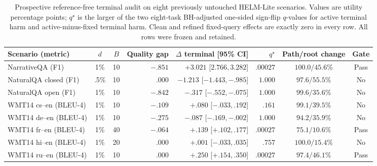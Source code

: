 \begin{table}[H]
\centering
\caption{Prospective reference-free terminal audit on eight previously untouched HELM-Lite scenarios. Values are utility percentage points; $q^\star$ is the larger of the two eight-task BH-adjusted one-sided sign-flip $q$-values for active terminal harm and active-minus-fixed terminal harm. Clean and refined fixed-query effects are exactly zero in every row. All rows were frozen and retained.}
\label{tab:step87b-reference-free}
\scriptsize
\setlength{\tabcolsep}{3.2pt}
\begin{tabular}{@{}lccrrrcc@{}}
\toprule
Scenario (metric) & $d$ & $B$ & Quality gap & $\Delta$ terminal [95\% CI] & $q^\star$ & Path/root change & Gate \\
\midrule
NarrativeQA (F1) & 1\% & 10 & $-.851$ & $+3.021$ [$2.766,3.282$] & $.00027$ & $100.0/45.6$\% & Pass \\
NaturalQA closed (F1) & .5\% & 10 & $.000$ & $-1.213$ [$-1.443,-.985$] & $1.000$ & $97.6/55.5$\% & No \\
NaturalQA open (F1) & 1\% & 10 & $-.842$ & $-.317$ [$-.552,-.075$] & $1.000$ & $99.6/35.6$\% & No \\
WMT14 cs--en (BLEU-4) & 1\% & 10 & $-.109$ & $+.080$ [$-.033,.192$] & $.161$ & $99.1/39.5$\% & No \\
WMT14 de--en (BLEU-4) & 1\% & 10 & $-.275$ & $-.087$ [$-.169,-.002$] & $1.000$ & $94.2/35.9$\% & No \\
WMT14 fr--en (BLEU-4) & 1\% & 40 & $-.064$ & $+.139$ [$+.102,.177$] & $.00027$ & $75.1/10.6$\% & Pass \\
WMT14 hi--en (BLEU-4) & 1\% & 20 & $.000$ & $+.001$ [$-.033,.035$] & $.757$ & $100.0/15.4$\% & No \\
WMT14 ru--en (BLEU-4) & 1\% & 10 & $.000$ & $+.250$ [$+.154,.350$] & $.00027$ & $97.4/46.1$\% & Pass \\
\bottomrule
\end{tabular}
\end{table}

